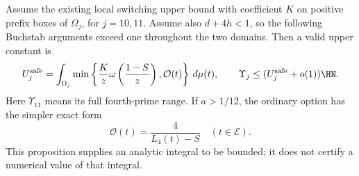 \begin{proposition}
\label{prop:four-prefix-safe-minimum}
Assume the existing local switching upper bound with coefficient
$K$ on positive prefix boxes of $\Omega_j$, for $j=10,11$.
Assume also $d+4h<1$, so the following Buchstab arguments exceed
one throughout the two domains.  Then a valid upper constant is
\begin{equation}\label{eq:four-prefix-safe-minimum}
 U_j^{\rm safe}
 =\int_{\Omega_j}
   \min\left\{\frac Kz\omega\left(\frac{1-S}{z}\right),
                   \mathcal O(t)\right\}\,d\mu(t),
 \qquad \Upsilon_j\le (U_j^{\rm safe}+o(1))\HN.
\end{equation}
Here $\Upsilon_{11}$ means its full fourth-prime range.  If
$a>1/12$, the ordinary option has the simpler exact form
\begin{equation}\label{eq:four-prefix-rational-kernel}
 \mathcal O(t)=\frac4{L_4(t)-S}\quad(t\in\mathcal E).
\end{equation}
This proposition supplies an analytic integral to be bounded; it
does not certify a numerical value of that integral.
\end{proposition}

